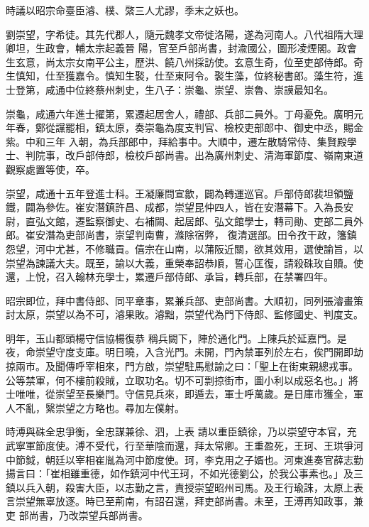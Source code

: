 \begin{pinyinscope}
 時議以昭宗命臺臣濬、樸、綮三人尤謬，季末之妖也。



 劉崇望，字希徒。其先代郡人，隨元魏孝文帝徙洛陽，遂為河南人。八代祖隋大理卿坦，生政會，輔太宗起義晉
 陽，官至戶部尚書，封渝國公，圖形凌煙閣。政會生玄意，尚太宗女南平公主，歷洪、饒八州採訪使。玄意生奇，位至吏部侍郎。奇生慎知，仕至獲嘉令。慎知生褧，仕至東阿令。褧生藻，位終秘書郎。藻生符，進士登第，咸通中位終蔡州刺史，生八子：崇龜、崇望、崇魯、崇謨最知名。



 崇龜，咸通六年進士擢第，累遷起居舍人，禮部、兵部二員外。丁母憂免。廣明元年春，鄭從讜罷相，鎮太原，奏崇龜為度支判官、檢校吏部郎中、御史中丞，賜金紫。中和三年
 入朝，為兵部郎中，拜給事中。大順中，遷左散騎常侍、集賢殿學士、判院事，改戶部侍郎，檢校戶部尚書。出為廣州刺史、清海軍節度、嶺南東道觀察處置等使，卒。



 崇望，咸通十五年登進士科。王凝廉問宣歙，闢為轉運巡官。戶部侍郎裴坦領鹽鐵，闢為參佐。崔安潛鎮許昌、成都，崇望昆仲四人，皆在安潛幕下。入為長安尉，直弘文館，遷監察御史、右補闕、起居郎、弘文館學士，轉司勛、吏部二員外郎。崔安潛為吏部尚書，崇望判南曹，滌除宿弊，
 復清選部。田令孜干政，籓鎮怨望，河中尤甚，不修職貢。僖宗在山南，以蒲阪近關，欲其效用，選使諭旨，以崇望為諫議大夫。既至，諭以大義，重榮奉詔恭順，誓心匡復，請殺硃玫自贖。使還，上悅，召入翰林充學士，累遷戶部侍郎、承旨，轉兵部，在禁署四年。



 昭宗即位，拜中書侍郎、同平章事，累兼兵部、吏部尚書。大順初，同列張濬畫策討太原，崇望以為不可，濬果敗。濬黜，崇望代為門下侍郎、監修國史、判度支。



 明年，玉山都頭楊守信協楊復恭
 稱兵闕下，陣於通化門。上陳兵於延嘉門。是夜，命崇望守度支庫。明日曉，入含光門。未開，門內禁軍列於左右，俟門開即劫掠兩市。及聞傳呼宰相來，門方啟，崇望駐馬慰諭之曰：「聖上在街東親總戎事。公等禁軍，何不樓前殺賊，立取功名。切不可剽掠街市，圖小利以成惡名也。」將士唯唯，從崇望至長樂門。守信見兵來，即遁去，軍士呼萬歲。是日庫市獲全，軍人不亂，繄崇望之方略也。尋加左僕射。



 時溥與硃全忠爭衡，全忠謀兼徐、泗，上表
 請以重臣鎮徐，乃以崇望守本官，充武寧軍節度使。溥不受代，行至華陰而還，拜太常卿。王重盈死，王珂、王珙爭河中節鉞，朝廷以宰相崔胤為河中節度使。珂，李克用之子婿也。河東進奏官薛志勤揚言曰：「崔相雖重德，如作鎮河中代王珂，不如光德劉公，於我公事素也。」及三鎮以兵入朝，殺害大臣，以志勤之言，責授崇望昭州司馬。及王行瑜誅，太原上表言崇望無辜放逐。時已至荊南，有詔召還，拜吏部尚書。未至，王溥再知政事，兼吏
 部尚書，乃改崇望兵部尚書。




\end{pinyinscope}
